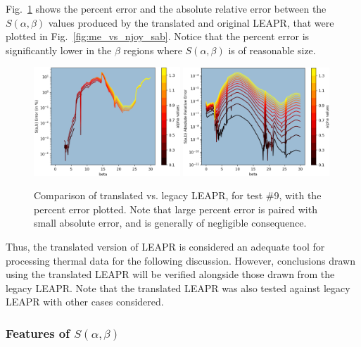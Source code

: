 \documentclass[Master.tex]{subfiles}
\begin{document}
    Fig.~\ref{fig:me_vs_njoy_error} shows the percent error and the absolute relative error between the $S(\alpha,\beta)$ values produced by the translated and original LEAPR, that were plotted in Fig.~\ref{fig:me_vs_njoy_sab}.  Notice that the percent error is significantly lower in the $\beta$ regions where $S(\alpha,\beta)$ is of reasonable size. 
    \begin{figure}[h]
      \begin{center}
        \includegraphics[width=0.49\textwidth]{images/me-vs-njoy-3c}
        \includegraphics[width=0.49\textwidth]{images/me-vs-njoy-4c}
        \caption[Comparison of Translated vs. Legacy LEAPR, for Test \#9 (\% Error) ]{Comparison of translated vs. legacy LEAPR, for test \#9, with the percent error plotted. Note that large percent error is paired with small absolute error, and is generally of negligible consequence.}
        \label{fig:me_vs_njoy_error}
      \end{center}
    \end{figure}
    Thus, the translated version of LEAPR is considered an adequate tool for processing thermal data for the following discussion. However, conclusions drawn using the translated LEAPR will be verified alongside those drawn from the legacy LEAPR. Note that the translated LEAPR was also tested against legacy LEAPR with other cases considered.


    \subsubsection{Features of $S(\alpha,\beta)$}
\end{document}
